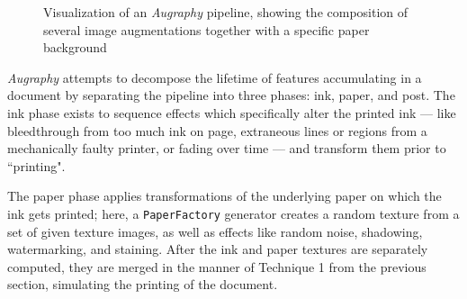 \documentclass[runningheads]{llncs}
\begin{document}
\begin{figure}
\centering
{}
\caption{Visualization of an \emph{Augraphy} pipeline, showing the composition of several image augmentations together with a specific paper background}
\label{fig:pipeline}
\end{figure}

\emph{Augraphy} attempts to decompose the lifetime of features accumulating in a document by separating the pipeline into three phases: ink, paper, and post.
The ink phase exists to sequence effects which specifically alter the printed ink --- like bleedthrough from too much ink on page, extraneous lines or regions from a mechanically faulty printer, or fading over time --- and transform them prior to ``printing".

The paper phase applies transformations of the underlying paper on which the ink gets printed; here, a \texttt{PaperFactory} generator creates a random texture from a set of given texture images, as well as effects like random noise, shadowing, watermarking, and staining.
After the ink and paper textures are separately computed, they are merged in the manner of Technique 1 from the previous section, simulating the printing of the document.
\end{document}
